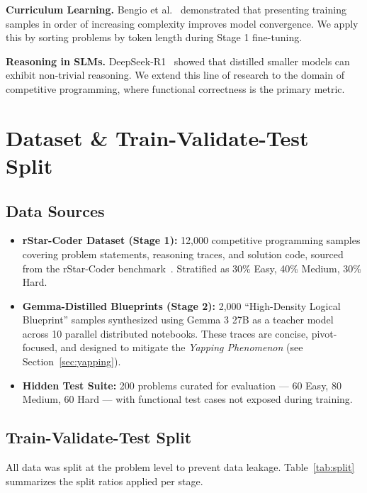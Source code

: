 \documentclass[preprint,12pt]{elsarticle}
\begin{document}
\textbf{Curriculum Learning.} Bengio et al.~\cite{bengio2009curriculum} demonstrated that presenting training samples in order of increasing complexity improves model convergence. We apply this by sorting problems by token length during Stage 1 fine-tuning.

\textbf{Reasoning in SLMs.} DeepSeek-R1~\cite{deepseek2024r1} showed that distilled smaller models can exhibit non-trivial reasoning. We extend this line of research to the domain of competitive programming, where functional correctness is the primary metric.

\section{Dataset \& Train-Validate-Test Split}
\label{sec:data}

\subsection{Data Sources}

\begin{itemize}
    \item \textbf{rStar-Coder Dataset (Stage 1):} 12,000 competitive programming samples covering problem statements, reasoning traces, and solution code, sourced from the rStar-Coder benchmark~\cite{rstar2024}. Stratified as 30\% Easy, 40\% Medium, 30\% Hard.
    \item \textbf{Gemma-Distilled Blueprints (Stage 2):} 2,000 ``High-Density Logical Blueprint'' samples synthesized using Gemma 3 27B as a teacher model across 10 parallel distributed notebooks. These traces are concise, pivot-focused, and designed to mitigate the \textit{Yapping Phenomenon} (see Section~\ref{sec:yapping}).
    \item \textbf{Hidden Test Suite:} 200 problems curated for evaluation — 60 Easy, 80 Medium, 60 Hard — with functional test cases not exposed during training.
\end{itemize}

\subsection{Train-Validate-Test Split}

All data was split at the problem level to prevent data leakage. Table~\ref{tab:split} summarizes the split ratios applied per stage.
\end{document}
